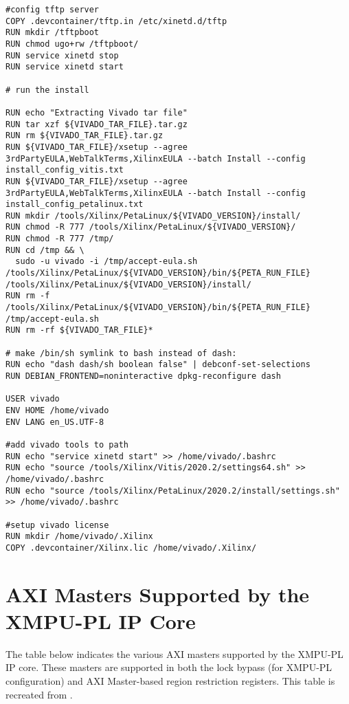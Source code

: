 \begin{lstlisting}[language=docker, breaklines=true, caption={Dockerfile for EDF Development Container}, label=lst:Dockerfile]
#config tftp server
COPY .devcontainer/tftp.in /etc/xinetd.d/tftp
RUN mkdir /tftpboot
RUN chmod ugo+rw /tftpboot/
RUN service xinetd stop
RUN service xinetd start

# run the install

RUN echo "Extracting Vivado tar file" 
RUN tar xzf ${VIVADO_TAR_FILE}.tar.gz 
RUN rm ${VIVADO_TAR_FILE}.tar.gz
RUN ${VIVADO_TAR_FILE}/xsetup --agree 3rdPartyEULA,WebTalkTerms,XilinxEULA --batch Install --config install_config_vitis.txt 
RUN ${VIVADO_TAR_FILE}/xsetup --agree 3rdPartyEULA,WebTalkTerms,XilinxEULA --batch Install --config install_config_petalinux.txt
RUN mkdir /tools/Xilinx/PetaLinux/${VIVADO_VERSION}/install/
RUN chmod -R 777 /tools/Xilinx/PetaLinux/${VIVADO_VERSION}/
RUN chmod -R 777 /tmp/
RUN cd /tmp && \
  sudo -u vivado -i /tmp/accept-eula.sh /tools/Xilinx/PetaLinux/${VIVADO_VERSION}/bin/${PETA_RUN_FILE} /tools/Xilinx/PetaLinux/${VIVADO_VERSION}/install/
RUN rm -f /tools/Xilinx/PetaLinux/${VIVADO_VERSION}/bin/${PETA_RUN_FILE} /tmp/accept-eula.sh
RUN rm -rf ${VIVADO_TAR_FILE}*

# make /bin/sh symlink to bash instead of dash:
RUN echo "dash dash/sh boolean false" | debconf-set-selections
RUN DEBIAN_FRONTEND=noninteractive dpkg-reconfigure dash

USER vivado
ENV HOME /home/vivado
ENV LANG en_US.UTF-8

#add vivado tools to path
RUN echo "service xinetd start" >> /home/vivado/.bashrc
RUN echo "source /tools/Xilinx/Vitis/2020.2/settings64.sh" >> /home/vivado/.bashrc
RUN echo "source /tools/Xilinx/PetaLinux/2020.2/install/settings.sh" >> /home/vivado/.bashrc

#setup vivado license
RUN mkdir /home/vivado/.Xilinx
COPY .devcontainer/Xilinx.lic /home/vivado/.Xilinx/
\end{lstlisting}

\chapter{AXI Masters Supported by the XMPU-PL IP Core}\label{apx:axi-masters}
The table below indicates the various AXI masters supported by the XMPU-PL IP core. These masters are supported in both the lock bypass (for XMPU-PL configuration) and AXI Master-based region restriction registers. This table is recreated from \cite{noauthor_memory_2021}.

